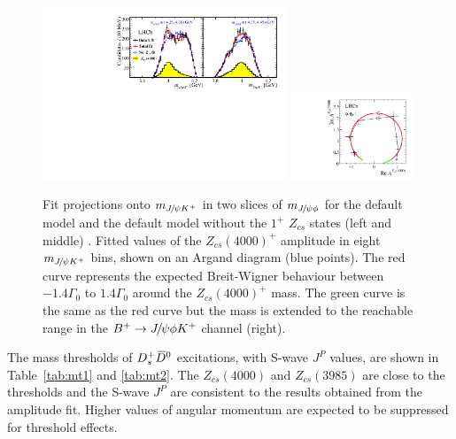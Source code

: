 \begin{figure}[!hbtp]
\centering
   \includegraphics[width=0.65\textwidth]{Figures/01_Introduction/Exotic/Zcs/jpsik_projection} %
   \includegraphics[width=0.325\textwidth]{Figures/01_Introduction/Exotic/Zcs/Z1_argand} %
   \caption{
   Fit projections onto $m_{{{J\mskip -3mu/\mskip -2mu\psi}}{{K}^+}}$ in two slices of $m_{{{J\mskip -3mu/\mskip -2mu\psi}}\phi}$ for the default model and the default model 
   without the $1^+$ $Z_{cs}$ states (left and middle) .
   Fitted values of the $Z_{cs}(4000)^+$ amplitude in eight $m_{{{J\mskip -3mu/\mskip -2mu\psi}}{{K}^+}}$ bins,
   shown on an Argand diagram (blue points).
   The red curve represents the expected Breit-Wigner behaviour between $-1.4\Gamma_0$ to $1.4\Gamma_0$ around the $Z_{cs}(4000)^+$ mass.
   The green curve is the same as the red curve but the mass is extended to the reachable range in the ${{{B}^+}}\rightarrow{\ensuremath{{J\mskip -3mu/\mskip -2mu\psi}}}\phi{\ensuremath{{K}^+}}$ channel (right).}
\label{fig:Zcs4000}
\end{figure}

The mass thresholds of ${{D}^+_{s}}{{\kern 0.18em\overline{\kern -0.18em D}}{}^0}$ excitations, 
with S-wave $J^P$ values, 
are shown in Table~\ref{tab:mt1} and \ref{tab:mt2}.
The $Z_{cs}(4000)$ and $Z_{cs}(3985)$ are close to the thresholds 
and the S-wave $J^P$ are consistent to the results obtained from the amplitude fit. 
Higher values of angular momentum are expected to be suppressed for threshold effects.

